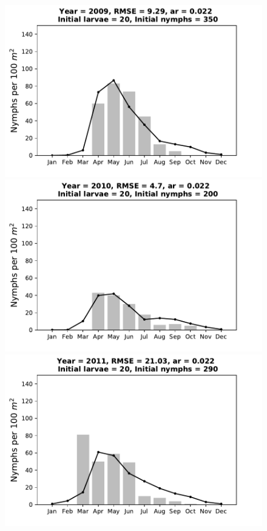 \documentclass[a4paper, 11pt]{scrartcl}
\begin{document}
\begin{figure}[h!]
\centering
\begin{minipage}[c]{0.40\linewidth}
\includegraphics[width=\linewidth]{figures/s3/S3_2009}
\end{minipage}
\begin{minipage}[c]{0.40\linewidth}
\includegraphics[width=\linewidth]{figures/s3/S3_2010}
\end{minipage}
\begin{minipage}[c]{0.40\linewidth}
\includegraphics[width=\linewidth]{figures/s3/S3_2011}

\end{minipage}
\end{figure}
\end{document}
